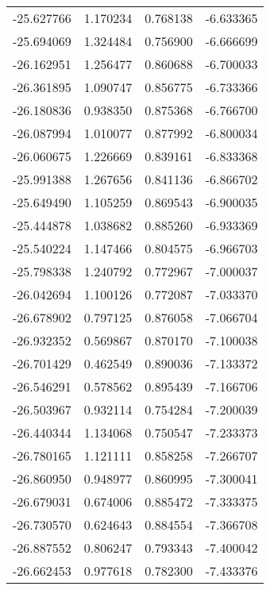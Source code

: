 \begin{tabular}{rrrr}
      -25.627766 &         1.170234 &    0.768138 &  -6.633365 \\
      -25.694069 &         1.324484 &    0.756900 &  -6.666699 \\
      -26.162951 &         1.256477 &    0.860688 &  -6.700033 \\
      -26.361895 &         1.090747 &    0.856775 &  -6.733366 \\
      -26.180836 &         0.938350 &    0.875368 &  -6.766700 \\
      -26.087994 &         1.010077 &    0.877992 &  -6.800034 \\
      -26.060675 &         1.226669 &    0.839161 &  -6.833368 \\
      -25.991388 &         1.267656 &    0.841136 &  -6.866702 \\
      -25.649490 &         1.105259 &    0.869543 &  -6.900035 \\
      -25.444878 &         1.038682 &    0.885260 &  -6.933369 \\
      -25.540224 &         1.147466 &    0.804575 &  -6.966703 \\
      -25.798338 &         1.240792 &    0.772967 &  -7.000037 \\
      -26.042694 &         1.100126 &    0.772087 &  -7.033370 \\
      -26.678902 &         0.797125 &    0.876058 &  -7.066704 \\
      -26.932352 &         0.569867 &    0.870170 &  -7.100038 \\
      -26.701429 &         0.462549 &    0.890036 &  -7.133372 \\
      -26.546291 &         0.578562 &    0.895439 &  -7.166706 \\
      -26.503967 &         0.932114 &    0.754284 &  -7.200039 \\
      -26.440344 &         1.134068 &    0.750547 &  -7.233373 \\
      -26.780165 &         1.121111 &    0.858258 &  -7.266707 \\
      -26.860950 &         0.948977 &    0.860995 &  -7.300041 \\
      -26.679031 &         0.674006 &    0.885472 &  -7.333375 \\
      -26.730570 &         0.624643 &    0.884554 &  -7.366708 \\
      -26.887552 &         0.806247 &    0.793343 &  -7.400042 \\
      -26.662453 &         0.977618 &    0.782300 &  -7.433376 \\

\end{tabular}
